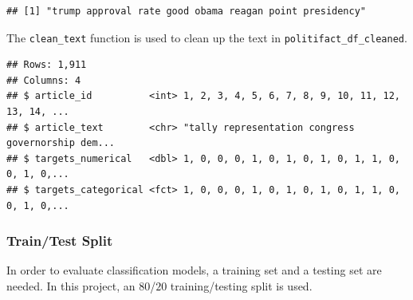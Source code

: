 \documentclass[12pt]{article}
\newenvironment{Shaded}{\begin{snugshade}}{\end{snugshade}}
\newcommand{\CommentTok}[1]{\textcolor[rgb]{0.56,0.35,0.01}{\textit{#1}}}
\newcommand{\DataTypeTok}[1]{\textcolor[rgb]{0.13,0.29,0.53}{#1}}
\newcommand{\KeywordTok}[1]{\textcolor[rgb]{0.13,0.29,0.53}{\textbf{#1}}}
\newcommand{\NormalTok}[1]{#1}
\newcommand{\OperatorTok}[1]{\textcolor[rgb]{0.81,0.36,0.00}{\textbf{#1}}}
\newcommand{\StringTok}[1]{\textcolor[rgb]{0.31,0.60,0.02}{#1}}
\begin{document}
\begin{verbatim}
## [1] "trump approval rate good obama reagan point presidency"
\end{verbatim}

The \texttt{clean\_text} function is used to clean up the text in
\texttt{politifact\_df\_cleaned}.

\begin{Shaded}
\end{Shaded}

\begin{verbatim}
## Rows: 1,911
## Columns: 4
## $ article_id          <int> 1, 2, 3, 4, 5, 6, 7, 8, 9, 10, 11, 12, 13, 14, ...
## $ article_text        <chr> "tally representation congress governorship dem...
## $ targets_numerical   <dbl> 1, 0, 0, 0, 1, 0, 1, 0, 1, 0, 1, 1, 0, 0, 1, 0,...
## $ targets_categorical <fct> 1, 0, 0, 0, 1, 0, 1, 0, 1, 0, 1, 1, 0, 0, 1, 0,...
\end{verbatim}

\hypertarget{traintest-split}{%
\subsubsection{Train/Test Split}\label{traintest-split}}

In order to evaluate classification models, a training set and a testing
set are needed. In this project, an \(80%
\)/\(20%
\) training/testing split is used.
\end{document}
